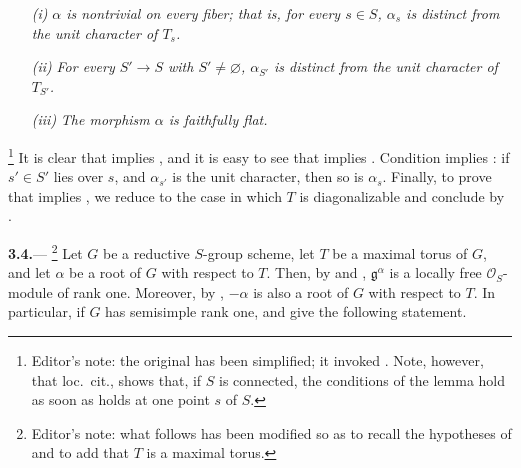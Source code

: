 \begin{enumerate}
\item[\textit{\SGAInlineRefTarget{sga3:xix:lemma:3:3:item:i}(i)}]
\textit{\(\alpha\) is nontrivial on every fiber; that is, for every
\(s\in S\), \(\alpha_s\) is distinct from the unit character of
\(T_s\).}

\item[\textit{\SGAInlineRefTarget{sga3:xix:lemma:3:3:item:ii}(ii)}]
\textit{For every \(S'\to S\) with \(S'\ne\varnothing\),
\(\alpha_{S'}\) is distinct from the unit character of \(T_{S'}\).}

\item[\textit{\SGAInlineRefTarget{sga3:xix:lemma:3:3:item:iii}(iii)}]
\textit{The morphism \(\alpha\) is faithfully flat.}
\end{enumerate}

\footnote{Editor's note: the original has been simplified; it invoked
.  Note, however, that loc.\ cit.,  shows that, if
\(S\) is connected, the conditions of the lemma hold as soon as
\textup{} holds at one point \(s\) of \(S\).}
It is clear that  implies , and it is easy to see that 
implies .  Condition  implies : if \(s'\in S'\) lies over
\(s\), and \(\alpha_{s'}\) is the unit character, then so is
\(\alpha_s\).  Finally, to prove that  implies , we reduce to
the case in which \(T\) is diagonalizable and conclude by .

\par\medskip\noindent
\textbf{3.4.}---%
\footnote{Editor's note: what follows has been modified so as to recall
the hypotheses of  and to add that \(T\) is a maximal torus.}
Let \(G\) be a reductive \(S\)-group scheme, let \(T\) be a maximal
torus of \(G\), and let \(\alpha\) be a root of \(G\) with respect to
\(T\).  Then, by  and , \(\mathfrak g^\alpha\) is a locally
free \(\mathcal O_S\)-module of rank one.  Moreover, by ,
\(-\alpha\) is also a root of \(G\) with respect to \(T\).  In
particular, if \(G\) has semisimple rank one,  and  give the
following statement.

